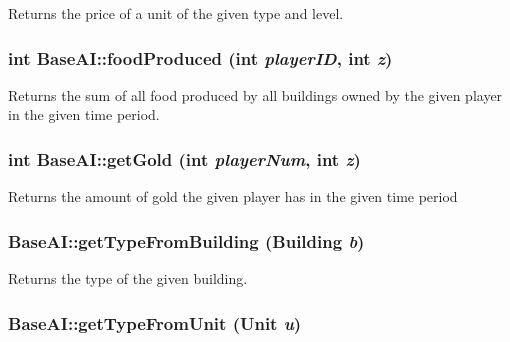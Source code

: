 Returns the price of a unit of the given type and level. \hypertarget{classBaseAI_43314f174d849c294ec84a09af6b55e2}{
\subsubsection[{foodProduced}]{\setlength{\rightskip}{0pt plus 5cm}int BaseAI::foodProduced (int {\em playerID}, \/  int {\em z})}}
\label{classBaseAI_43314f174d849c294ec84a09af6b55e2}


Returns the sum of all food produced by all buildings owned by the given player in the given time period. \hypertarget{classBaseAI_c079405ee4fd5cec789af0f627d3d175}{
\subsubsection[{getGold}]{\setlength{\rightskip}{0pt plus 5cm}int BaseAI::getGold (int {\em playerNum}, \/  int {\em z})}}
\label{classBaseAI_c079405ee4fd5cec789af0f627d3d175}


Returns the amount of gold the given player has in the given time period \hypertarget{classBaseAI_ca41bf18cdb670b9bcc5fe92eae198ad}{
\subsubsection[{getTypeFromBuilding}]{ BaseAI::getTypeFromBuilding ({\bf Building} {\em b})}}
\label{classBaseAI_ca41bf18cdb670b9bcc5fe92eae198ad}


Returns the type of the given building. \hypertarget{classBaseAI_9bd3c6a1259db084fa6780d50bea95eb}{
\subsubsection[{getTypeFromUnit}]{ BaseAI::getTypeFromUnit ({\bf Unit} {\em u})}}
\label{classBaseAI_9bd3c6a1259db084fa6780d50bea95eb}


